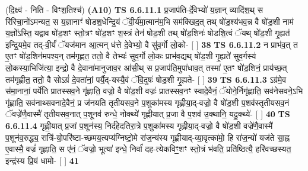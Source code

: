 \documentclass[17pt]{extarticle}
\begin{document}
                  \newline
                      (दि॒क्ष्व॑ - निति - विꣳश॒तिश्च॑)  \textbf{(A10)} \newline \newline
                                        \textbf{ TS 6.6.11.1} \newline
                  प्र॒जाप॑ति-र्दे॒वेभ्यो॑ य॒ज्ञान् व्यादि॑श॒थ् स रि॑रिचा॒नो॑ऽमन्यत॒ स य॒ज्ञानाꣳ॑ षोडश॒धेन्द्रि॒यं ॅवी॒र्य॑मा॒त्मान॑म॒भि सम॑क्खिद॒त् तथ् षो॑ड॒श्य॑भव॒न्न वै षो॑ड॒शी नाम॑ य॒ज्ञो᳚ऽस्ति॒ यद्वाव षो॑ड॒शꣳ स्तो॒त्रꣳ षो॑ड॒शꣳ श॒स्त्रं तेन॑ षोड॒शी तथ् षो॑ड॒शिनः॑ षोडशि॒त्वं ॅयथ् षो॑ड॒शी गृ॒ह्यत॑ इन्द्रि॒यमे॒व तद्-वी॒र्यं॑ ॅयज॑मान आ॒त्मन् ध॑त्ते दे॒वेभ्यो॒ वै सु॑व॒र्गो लो॒को- [  ] \textbf{  38} \newline
                  \newline
                                \textbf{ TS 6.6.11.2} \newline
                  न प्राभ॑व॒त् त ए॒तꣳ षो॑ड॒शिन॑मपश्य॒न् तम॑गृह्णत॒ ततो॒ वै तेभ्यः॑ सुव॒र्गो लो॒कः प्राभ॑व॒द्यथ् षो॑ड॒शी गृ॒ह्यते॑ सुव॒र्गस्य॑ लो॒कस्या॒भिजि॑त्या॒ इन्द्रो॒ वै दे॒वाना॑मानुजाव॒र आ॑सी॒थ् स प्र॒जाप॑ति॒मुपा॑धाव॒त् तस्मा॑ ए॒तꣳ षो॑ड॒शिनं॒ प्राय॑च्छ॒त् तम॑गृह्णीत॒ ततो॒ वै सोऽग्रं॑ दे॒वता॑नां॒ पर्यै॒द्-यस्यै॒वं ॅवि॒दुषः॑ षोड॒शी गृ॒ह्यते- [  ] \textbf{  39} \newline
                  \newline
                                \textbf{ TS 6.6.11.3} \newline
                  ऽग्र॑मे॒व स॑मा॒नानां॒ पर्ये॑ति प्रातस्सव॒ने गृ॑ह्णाति॒ वज्रो॒ वै षो॑ड॒शी वज्रः॑ प्रातस्सव॒नꣳ स्वादे॒वैनं॒ ॅयोने॒र्निगृ॑ह्णाति॒ सव॑नेसवने॒ऽभि गृ॑ह्णाति॒ सव॑नाथ्सवनादे॒वैनं॒ प्र ज॑नयति तृतीयसव॒ने प॒शुका॑मस्य गृह्णीया॒द्-वज्रो॒ वै षो॑ड॒शी प॒शव॑स्तृतीयसव॒नं ॅवज्रे॑णै॒वास्मै॑ तृतीयसव॒नात् प॒शूनव॑ रुन्धे॒ नोक्थ्ये॑ गृह्णीयात् प्र॒जा वै प॒शव॑ उ॒क्थानि॒ यदु॒क्थ्ये॑- [  ] \textbf{  40} \newline
                  \newline
                                \textbf{ TS 6.6.11.4} \newline
                  गृह्णी॒यात् प्र॒जां प॒शून॑स्य॒ निर्द॑हेदतिरा॒त्रे प॒शुका॑मस्य गृह्णीया॒द्-वज्रो॒ वै षो॑ड॒शी वज्रे॑णै॒वास्मै॑ प॒शून॑व॒रुद्ध्य॒ रात्रि॑-यो॒परि॑ष्टा-च्छमय॒त्यप्य॑ग्निष्टो॒मे रा॑ज॒न्य॑स्य गृह्णीयाद्-व्या॒वृत्का॑मो॒ हि रा॑ज॒न्यो॑ यज॑ते सा॒ह्न ए॒वास्मै॒ वज्रं॑ गृह्णाति॒ स ए॑नं॒ ॅवज्रो॒ भूत्या॑ इन्धे॒ निर्वा॑ दह-त्येकविꣳ॒॒शꣳ स्तो॒त्रं भ॑वति॒ प्रति॑ष्ठित्यै॒ हरि॑वच्छस्यत॒ इन्द्र॑स्य प्रि॒यं धामो- [  ] \textbf{  41} \newline
\end{document}
